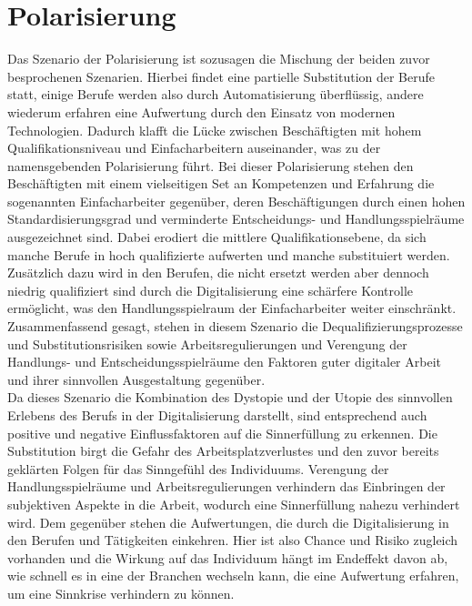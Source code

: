 \section{Polarisierung}
Das Szenario der Polarisierung ist sozusagen die Mischung der beiden zuvor besprochenen Szenarien. Hierbei findet eine partielle Substitution der Berufe statt, einige Berufe werden also durch Automatisierung überflüssig, andere wiederum erfahren eine Aufwertung durch den Einsatz von modernen Technologien. Dadurch klafft die Lücke zwischen Beschäftigten mit hohem Qualifikationsniveau und Einfacharbeitern auseinander, was zu der namensgebenden Polarisierung führt. Bei dieser Polarisierung stehen den Beschäftigten mit einem vielseitigen Set an Kompetenzen und Erfahrung die sogenannten Einfacharbeiter gegenüber, deren Beschäftigungen durch einen hohen Standardisierungsgrad und verminderte Entscheidungs- und Handlungsspielräume ausgezeichnet sind. Dabei erodiert die mittlere Qualifikationsebene, da sich manche Berufe in hoch qualifizierte aufwerten und manche substituiert werden. Zusätzlich dazu wird in den Berufen, die nicht ersetzt werden aber dennoch niedrig qualifiziert sind durch die Digitalisierung eine schärfere Kontrolle ermöglicht, was den Handlungsspielraum der Einfacharbeiter weiter einschränkt. Zusammenfassend gesagt, stehen in diesem Szenario die Dequalifizierungsprozesse und Substitutionsrisiken sowie Arbeitsregulierungen und Verengung der Handlungs- und Entscheidungsspielräume den Faktoren guter digitaler Arbeit und ihrer sinnvollen Ausgestaltung gegenüber\cite[S.183-184]{Eisenmann.2018}.\\

Da dieses Szenario die Kombination des Dystopie und der Utopie des sinnvollen Erlebens des Berufs in der Digitalisierung darstellt, sind entsprechend auch positive und negative Einflussfaktoren auf die Sinnerfüllung zu erkennen. Die Substitution birgt die Gefahr des Arbeitsplatzverlustes und den zuvor bereits geklärten Folgen für das Sinngefühl des Individuums. Verengung der Handlungsspielräume und Arbeitsregulierungen verhindern das Einbringen der subjektiven Aspekte in die Arbeit, wodurch eine Sinnerfüllung nahezu verhindert wird. Dem gegenüber stehen die Aufwertungen, die durch die Digitalisierung in den Berufen und Tätigkeiten einkehren. Hier ist also Chance und Risiko zugleich vorhanden und die Wirkung auf das Individuum hängt im Endeffekt davon ab, wie schnell es in eine der Branchen wechseln kann, die eine Aufwertung erfahren, um eine Sinnkrise verhindern zu können.

